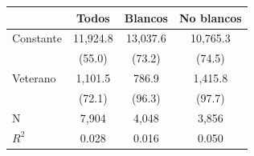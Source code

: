 \begin{tabular}[t]{lccc}
\toprule
  & Todos & Blancos & No blancos\\
\midrule
Constante & 11,924.8 & 13,037.6 & 10,765.3\\
 & (55.0) & (73.2) & (74.5)\\
Veterano & 1,101.5 & 786.9 & 1,415.8\\
 & (72.1) & (96.3) & (97.7)\\
\midrule
N & 7,904 & 4,048 & 3,856\\
$R^2$ & 0.028 & 0.016 & 0.050\\
\bottomrule
\end{tabular}
